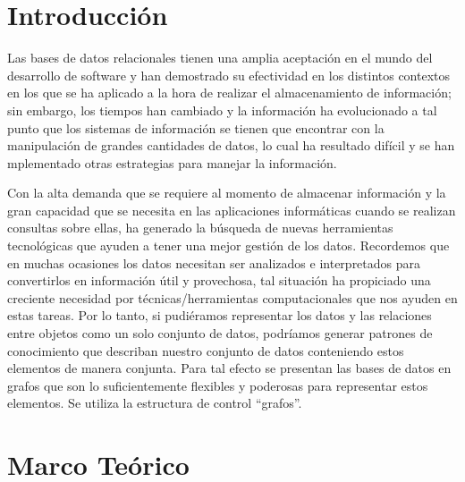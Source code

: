 \documentclass[preprint,12pt]{elsarticle}
\begin{document}



\section{Introducción} 

Las bases de datos relacionales tienen una amplia aceptación en el mundo del desarrollo de software y han demostrado su efectividad en los distintos contextos en los que se ha aplicado a la hora de realizar el almacenamiento de información; sin embargo, los tiempos han cambiado y la información ha evolucionado a tal punto que los sistemas de información se tienen que encontrar con la manipulación de grandes cantidades de datos, lo cual ha resultado difícil y se han  mplementado otras estrategias para manejar la información.

Con la alta demanda que se requiere al momento de almacenar información y la gran capacidad que se necesita en las aplicaciones informáticas cuando se realizan consultas sobre ellas, ha generado la búsqueda de nuevas herramientas tecnológicas que ayuden a tener una mejor gestión de los datos. Recordemos que en muchas ocasiones los datos necesitan ser analizados e interpretados para convertirlos en información útil y provechosa, tal situación ha propiciado una creciente necesidad por técnicas/herramientas computacionales que nos ayuden en estas tareas. Por lo tanto, si pudiéramos representar los datos y las relaciones entre objetos como un solo conjunto de datos, podríamos generar patrones de conocimiento que describan nuestro conjunto de datos conteniendo estos elementos de manera conjunta. Para tal efecto se presentan las bases de datos en grafos que son lo suficientemente flexibles y poderosas para representar estos elementos. Se utiliza la estructura de control “grafos”.






\section{Marco Teórico}
\end{document}
